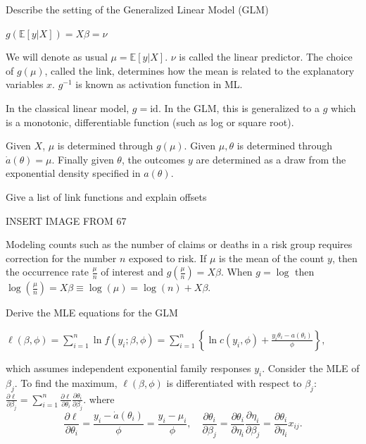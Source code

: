 Describe the setting of the Generalized Linear Model (GLM)

\( g(\mathbb{E}[y|X]) = X\beta = \nu\)

We will denote as usual \( \mu = \mathbb{E}[y|X] \).
\( \nu \) is called the linear predictor.
The choice of \( g(\mu) \), called the link, determines how the mean is related
to the explanatory variables \( x \). \( g^{-1} \) is known as activation function in ML.

In the classical linear model, \( g = \text{id} \).
In the GLM, this is generalized to a \( g \) which is a monotonic,
differentiable function (such as log or square root).

Given \( X \), \( \mu \) is determined through \( g(\mu) \). 
Given \( \mu, \theta \) is determined through \( \dot{a}(\theta) = \mu \). 
Finally given \( \theta \), the outcomes \( y \) are determined as a draw 
from the exponential density specified in \( a(\theta) \).

Give a list of link functions and explain offsets

INSERT IMAGE FROM 67


Modeling counts such as the number of claims or deaths in a risk group
requires correction for the number \( n \) exposed to risk. If \( \mu \) is the mean of the
count \( y \), then the occurrence rate \( \frac{\mu}{n} \) of interest and \( g(\frac{\mu}{n}) = X\beta \).
When \( g = \log \) then \( \log(\frac{\mu}{n}) = X\beta \equiv \log(\mu) = \log(n) + X\beta \).


Derive the MLE equations for the GLM

\(\ell(\beta, \phi) = \sum_{i=1}^{n} \ln f(y_i; \beta, \phi) = \sum_{i=1}^{n} \left\{ \ln c(y_i, \phi) + \frac{y_i \theta_i - a(\theta_i)}{\phi} \right\},\)

which assumes independent exponential family responses \(y_i\). Consider the MLE of \(\beta_j\). To find the maximum, \(\ell(\beta, \phi)\) is differentiated with respect to \(\beta_j\): 
\(\frac{\partial \ell}{\partial \beta_j} = \sum_{i=1}^{n} \frac{\partial \ell}{\partial \theta_i} \frac{\partial \theta_i}{\partial \beta_j}.\)
where
\[
\frac{\partial \ell}{\partial \theta_i} = \frac{y_i - \dot{a}(\theta_i)}{\phi} = \frac{y_i - \mu_i}{\phi}, \quad \frac{\partial \theta_i}{\partial \beta_j} = \frac{\partial \theta_i}{\partial \eta_i} \frac{\partial \eta_i}{\partial \beta_j} = \frac{\partial \theta_i}{\partial \eta_i} x_{ij}.
\]

